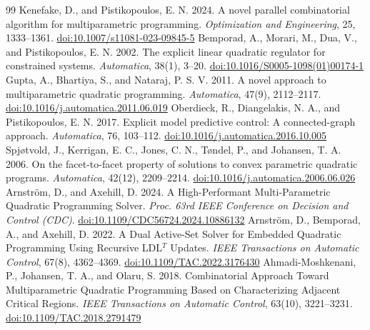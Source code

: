 \begin{thebibliography}{99}
\small
\setlength{\itemsep}{1pt}
 Kenefake, D., and Pistikopoulos, E. N. 2024. A novel parallel combinatorial algorithm for multiparametric programming. \emph{Optimization and Engineering}, 25, 1333--1361. \href{https://login.ezproxy.lib.purdue.edu/login?url=https://doi.org/10.1007/s11081-023-09845-5}{doi:10.1007/s11081-023-09845-5}
 Bemporad, A., Morari, M., Dua, V., and Pistikopoulos, E. N. 2002. The explicit linear quadratic regulator for constrained systems. \emph{Automatica}, 38(1), 3--20. \href{https://login.ezproxy.lib.purdue.edu/login?url=https://doi.org/10.1016/S0005-1098(01)00174-1}{doi:10.1016/S0005-1098(01)00174-1}
 Gupta, A., Bhartiya, S., and Nataraj, P. S. V. 2011. A novel approach to multiparametric quadratic programming. \emph{Automatica}, 47(9), 2112--2117. \href{https://login.ezproxy.lib.purdue.edu/login?url=https://doi.org/10.1016/j.automatica.2011.06.019}{doi:10.1016/j.automatica.2011.06.019}
 Oberdieck, R., Diangelakis, N. A., and Pistikopoulos, E. N. 2017. Explicit model predictive control: A connected-graph approach. \emph{Automatica}, 76, 103--112. \href{https://login.ezproxy.lib.purdue.edu/login?url=https://doi.org/10.1016/j.automatica.2016.10.005}{doi:10.1016/j.automatica.2016.10.005}
 Spj{\o}tvold, J., Kerrigan, E. C., Jones, C. N., T{\o}ndel, P., and Johansen, T. A. 2006. On the facet-to-facet property of solutions to convex parametric quadratic programs. \emph{Automatica}, 42(12), 2209--2214. \href{https://login.ezproxy.lib.purdue.edu/login?url=https://doi.org/10.1016/j.automatica.2006.06.026}{doi:10.1016/j.automatica.2006.06.026}
 Arnstr{\"o}m, D., and Axehill, D. 2024. A High-Performant Multi-Parametric Quadratic Programming Solver. \emph{Proc. 63rd IEEE Conference on Decision and Control (CDC)}. \href{https://login.ezproxy.lib.purdue.edu/login?url=https://doi.org/10.1109/CDC56724.2024.10886132}{doi:10.1109/CDC56724.2024.10886132}
 Arnstr{\"o}m, D., Bemporad, A., and Axehill, D. 2022. A Dual Active-Set Solver for Embedded Quadratic Programming Using Recursive {LDL}$^{T}$ Updates. \emph{IEEE Transactions on Automatic Control}, 67(8), 4362--4369. \href{https://login.ezproxy.lib.purdue.edu/login?url=https://doi.org/10.1109/TAC.2022.3176430}{doi:10.1109/TAC.2022.3176430}
 Ahmadi-Moshkenani, P., Johansen, T. A., and Olaru, S. 2018. Combinatorial Approach Toward Multiparametric Quadratic Programming Based on Characterizing Adjacent Critical Regions. \emph{IEEE Transactions on Automatic Control}, 63(10), 3221--3231. \href{https://login.ezproxy.lib.purdue.edu/login?url=https://doi.org/10.1109/TAC.2018.2791479}{doi:10.1109/TAC.2018.2791479}

\end{thebibliography}

